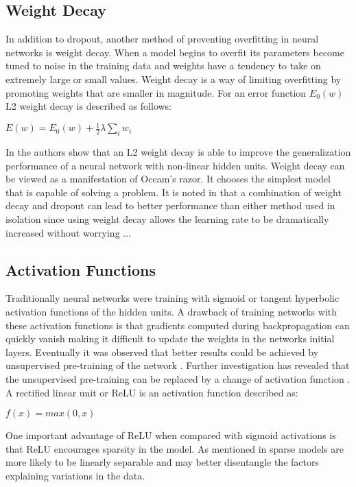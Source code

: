 \documentclass[12pt,letterpaper]{article}
\begin{document}
\subsection{Weight Decay}
In addition to dropout, another method of preventing overfitting in neural networks is weight decay.  When a model begins to overfit its parameters become tuned to noise in the training data and weights have a tendency to take on extremely large or small values.  Weight decay is a way of limiting overfitting by promoting weights that are smaller in magnitude. For an error function $E_0(w)$ L2 weight decay is described as follows:

$E(w) = E_0(w) + \frac{1}{2} \lambda \sum_i w_i$

In \cite{Krogh92asimple} the authors show that an L2 weight decay is able to improve the generalization performance of a neural network with non-linear hidden units.  Weight decay can be viewed as a manifestation of Occam's razor.  It chooses the simplest model that is capable of solving a problem.  It is noted in \cite{Srivastava:2014:DSW:2627435.2670313} that a combination of weight decay and dropout can lead to better performance than either method used in isolation since using weight decay allows the learning rate to be dramatically increased without worrying ...

\subsection{Activation Functions}
Traditionally neural networks were training with sigmoid or tangent hyperbolic activation functions of the hidden units.  A drawback of training networks with these activation functions is that gradients computed during backpropagation can quickly vanish making it difficult to update the weights in the networks initial layers.  Eventually it was observed that better results could be achieved by unsupervised pre-training of the network \cite{Vincent:2010:SDA:1756006.1953039}. Further investigation has revealed that the unsupervised pre-training can be replaced by a change of activation function \cite{AISTATS2011_GlorotBB11}.  A rectified linear unit or ReLU is an activation function described as:

$f(x) = max(0,x)$

One important advantage of ReLU when compared with sigmoid activations is that ReLU encourages sparsity in the model.  As mentioned in \cite{AISTATS2011_GlorotBB11} sparse models are more likely to be linearly separable and may better disentangle the factors explaining variations in the data.
\end{document}
